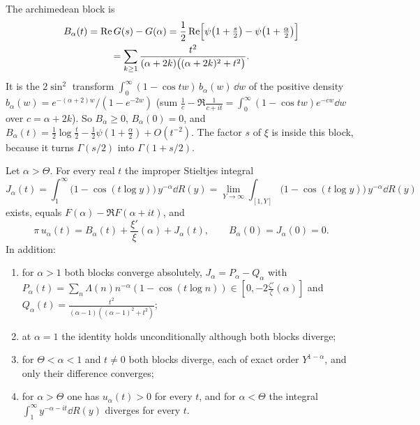 The archimedean block is
\begin{multline}\label{bo:eq:B}
B_\alpha(t)=\Re G(s)-G(\alpha)=\frac12\Re\Bigl[\psi\bigl(1+\tfrac s2\bigr)-\psi\bigl(1+\tfrac\alpha2\bigr)\Bigr]\\=\sum_{k\ge1}\frac{t^2}{(\alpha+2k)\bigl((\alpha+2k)^2+t^2\bigr)}.
\end{multline}
It is the $2\sin^2$ transform $\int_0^\infty(1-\cos tw)\,b_\alpha(w)\,\dd w$ of the positive density $b_\alpha(w)=e^{-(\alpha+2)w}/(1-e^{-2w})$ (sum $\frac1c-\Re\frac1{c+it}=\int_0^\infty(1-\cos tw)e^{-cw}\dd w$ over $c=\alpha+2k$). So $B_\alpha\ge0$, $B_\alpha(0)=0$, and $B_\alpha(t)=\frac12\log\frac t2-\frac12\psi(1+\frac\alpha2)+O(t^{-2})$. The factor $s$ of $\xi$ is inside this block, because it turns $\Gamma(s/2)$ into $\Gamma(1+s/2)$.

\begin{theorem}\label{bo:thm:ledger}
Let $\alpha>\Theta$. For every real $t$ the improper Stieltjes integral
\[
J_\alpha(t)=\int_1^\infty\bigl(1-\cos(t\log y)\bigr)\,y^{-\alpha}\dd R(y)=\lim_{Y\to\infty}\int_{[1,Y]}\bigl(1-\cos(t\log y)\bigr)\,y^{-\alpha}\dd R(y)
\]
exists, equals $F(\alpha)-\Re F(\alpha+it)$, and
\begin{equation}\label{bo:eq:ledger}
\pi\,u_\alpha(t)=B_\alpha(t)+\frac{\xi'}{\xi}(\alpha)+J_\alpha(t),\qquad B_\alpha(0)=J_\alpha(0)=0 .
\end{equation}
In addition:
\begin{enumerate}
\item for $\alpha>1$ both blocks converge absolutely, $J_\alpha=P_\alpha-Q_\alpha$ with $P_\alpha(t)=\sum_n\Lambda(n)n^{-\alpha}(1-\cos(t\log n))\in[0,-2\frac{\zeta'}{\zeta}(\alpha)]$ and $Q_\alpha(t)=\frac{t^2}{(\alpha-1)((\alpha-1)^2+t^2)}$;
\item at $\alpha=1$ the identity holds unconditionally although both blocks diverge;
\item for $\Theta<\alpha<1$ and $t\ne0$ both blocks diverge, each of exact order $Y^{1-\alpha}$, and only their difference converges;
\item for $\alpha>\Theta$ one has $u_\alpha(t)>0$ for every $t$, and for $\alpha<\Theta$ the integral $\int_1^\infty y^{-\alpha-it}\dd R(y)$ diverges for every $t$.
\end{enumerate}
\end{theorem}

